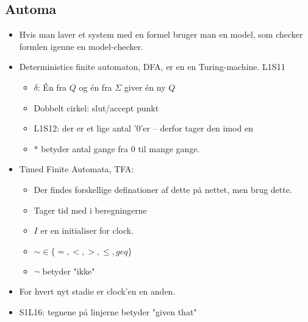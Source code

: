 \documentclass[oneside, 10pt]{article}
\begin{document}
\subsection{Automa}
\begin{itemize}
	\item Hvis man laver et system med en formel bruger man en model, som checker formlen igenne en model-checker.
	\item Deterministics finite automaton, DFA, er en en Turing-machine. L1S11
	\begin{itemize}
		\item $\delta$: Én fra $Q$ og én fra $\Sigma$ giver én ny $Q$
		\item Dobbelt cirkel: slut/accept punkt
		\item L1S12: der er et lige antal '0'er -- derfor tager den imod en 
		\item $*$ betyder antal gange fra 0 til mange gange.
	\end{itemize}

	\item Timed Finite Automata, TFA:
	\begin{itemize}
		\item Der findes forskellige definationer af dette på nettet, men brug dette.
		\item Tager tid med i beregningerne
		\item $I$ er en initialiser for clock.
		\item $\sim \in \{ =, <, >, \leq, geq\}$
		\item $\neg$ betyder "ikke"
	\end{itemize}

	\item For hvert nyt stadie er clock'en en anden.
	\item S1L16: tegnene på linjerne betyder "given that"

\end{itemize}
\end{document}
